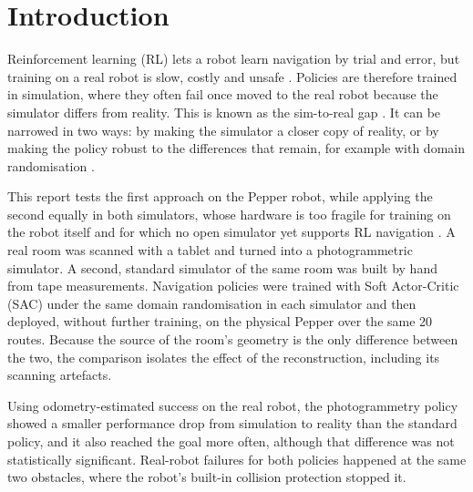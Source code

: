 \section{Introduction}\label{sec:introduction}
Reinforcement learning (RL) lets a robot learn navigation by trial and error, but training on a
real robot is slow, costly and unsafe \cite{sutton2018rl, zhao2020sim}. Policies are therefore
trained in simulation, where they often fail once moved to the real robot because the simulator
differs from reality. This is known as the sim-to-real gap \cite{zhao2020sim,
peng2018dynamics}. It can be narrowed in two ways: by making the simulator a closer copy of
reality, or by making the policy robust to the differences that remain, for example with domain
randomisation \cite{tobin2017domain, peng2018dynamics}.

This report tests the first approach on the Pepper robot, while applying the second equally in both
simulators, whose hardware is too fragile for training on the robot itself and for which no open
simulator yet supports RL navigation \cite{sekkat2024pepper}. A real room was scanned with a tablet
and turned into a photogrammetric simulator. A second, standard simulator of the same room was built
by hand from tape measurements. Navigation policies were trained with Soft Actor-Critic (SAC) under
the same domain randomisation in each simulator and then deployed, without further training, on the
physical Pepper over the same 20 routes. Because the source of the room's geometry is the only
difference between the two, the comparison isolates the effect of the reconstruction, including its
scanning artefacts.

Using odometry-estimated success on the real robot, the photogrammetry policy showed a smaller
performance drop from simulation to reality than the standard policy, and it also reached the goal
more often, although that difference was not statistically significant. Real-robot failures for both
policies happened at the same two obstacles, where the robot's built-in collision protection stopped
it.
